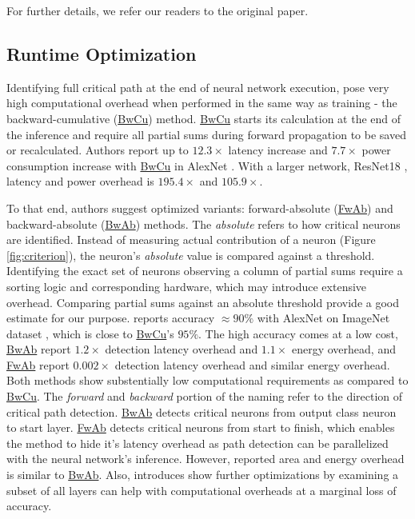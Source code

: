 \documentclass[11pt]{article}
\begin{document}
For further details, we refer our readers to the original paper.

\subsection{Runtime Optimization}

Identifying full critical path at the end of neural network execution, pose very high computational overhead when performed in the same way as training - the backward-cumulative (\underline{BwCu}) method. \underline{BwCu} starts its calculation at the end of the inference and require all partial sums during forward propagation to be saved or recalculated. Authors report up to $12.3\times$ latency increase and $7.7\times$ power consumption increase with \underline{BwCu} in AlexNet \cite{alexnet}. With a larger network, ResNet18 \cite{resnet18}, latency and power overhead is $195.4\times$ and $105.9\times$.

To that end, authors suggest optimized variants: forward-absolute (\underline{FwAb}) and backward-absolute (\underline{BwAb}) methods. The \textit{absolute} refers to how critical neurons are identified. Instead of measuring actual contribution of a neuron (Figure \ref{fig:criterion}), the neuron's \textit{absolute} value is compared against a threshold. Identifying the exact set of neurons observing a column of partial sums require a sorting logic and corresponding hardware, which may introduce extensive overhead. Comparing partial sums against an absolute threshold provide a good estimate for our purpose. \citeauthor{ptolemy} reports accuracy $ \approx 90\% $ with AlexNet on ImageNet dataset \cite{imagenet}, which is close to \underline{BwCu}'s $ 95\% $. The high accuracy comes at a low cost, \underline{BwAb} report $1.2\times$ detection latency overhead and $1.1\times$ energy overhead, and \underline{FwAb} report $0.002\times$ detection latency overhead and similar energy overhead. Both methods show substentially low computational requirements as compared to \underline{BwCu}. The \textit{forward} and \textit{backward} portion of the naming refer to the direction of critical path detection. \underline{BwAb} detects critical neurons from output class neuron to start layer. \underline{FwAb} detects critical neurons from start to finish, which enables the method to hide it's latency overhead as path detection can be parallelized with the neural network's inference. However, reported area and energy overhead is similar to \underline{BwAb}. Also, \citeauthor{ptolemy} introduces show further optimizations by examining a subset of all layers can help with computational overheads at a marginal loss of accuracy.
\end{document}
